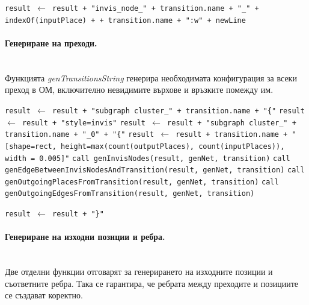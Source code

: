 \begin{algorithm}[H]
\caption{genEdgeBetweenInvisNodesAndTransition(result, genNet, transition)}
\begin{algorithmic}
    \State \texttt{result $\gets$ result + "invis\_node\_"{} + transition.name + "\_"{} + indexOf(inputPlace) +  +  transition.name + ":w"{} + newLine}
\EndFor
\end{algorithmic}
\end{algorithm}

\paragraph{Генериране на преходи.}
\mbox{}\\
Функцията \textit{genTransitionsString} генерира необходимата конфигурация за всеки преход в ОМ, включително невидимите върхове и връзките помежду им.

\begin{algorithm}[H]
\caption{genTransitionsString(genNet, result)}
\begin{algorithmic}
    \State \texttt{result $\gets$ result + "subgraph cluster\_"{} + transition.name + "\{"}
    \State \texttt{result $\gets$ result + "style=invis"}
    \State \texttt{result $\gets$ result + "subgraph cluster\_"{} + transition.name + "\_0"{} + "\{"}
    \State \texttt{result $\gets$ result + transition.name + 
    "[shape=rect, height=max(count(outputPlaces), count(inputPlaces)), width = 0.005]"}
    \State \texttt{call genInvisNodes(result, genNet, transition)}
    \State \texttt{call genEdgeBetweenInvisNodesAndTransition(result, genNet, transition)}
    \State \texttt{call genOutgoingPlacesFromTransition(result, genNet, transition)}
    \State \texttt{call genOutgoingEdgesFromTransition(result, genNet, transition)}

    \texttt{result $\gets$ result + "\}"}
\EndFor
\end{algorithmic}
\end{algorithm}

\paragraph{Генериране на изходни позиции и ребра.}
\mbox{}\\
Две отделни функции отговарят за генерирането на изходните позиции и съответните ребра. Така се гарантира, че ребрата между преходите и позициите се създават коректно.

